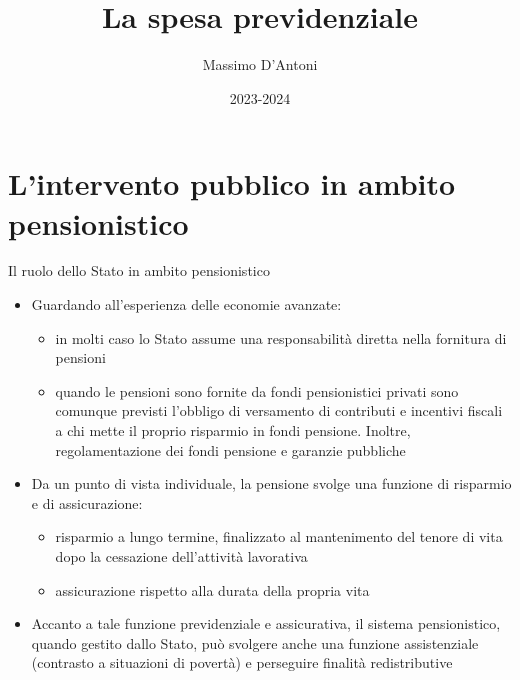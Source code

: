 \documentclass[11pt]{beamer}
\institute{Università di Siena}
\author{Massimo D'Antoni}
\date{2023-2024}
\title{La spesa previdenziale}
\begin{document}
\maketitle

\section{L'intervento pubblico in ambito pensionistico}

\begin{frame}{Il ruolo dello Stato in ambito pensionistico}
\begin{itemize}
\item Guardando all'esperienza delle economie avanzate:
\begin{itemize}
\item in molti caso lo Stato assume una responsabilità diretta nella fornitura di
pensioni
\item quando le pensioni sono fornite da fondi pensionistici privati sono
comunque previsti l'obbligo di versamento di contributi e incentivi
fiscali a chi mette il proprio risparmio in fondi pensione. Inoltre,
regolamentazione dei fondi pensione e garanzie pubbliche
\end{itemize}

\item Da un punto di vista individuale, la pensione svolge una funzione di
\alert{risparmio} e di \alert{assicurazione}:
\begin{itemize}
\item risparmio a lungo termine, finalizzato al mantenimento del tenore di vita
dopo la cessazione dell'attività lavorativa
\item assicurazione rispetto alla durata della propria vita
\end{itemize}

\item Accanto a tale funzione \alert{previdenziale} e \alert{assicurativa}, il sistema
pensionistico, quando gestito dallo Stato, può svolgere anche una funzione
\alert{assistenziale} (contrasto a situazioni di povertà) e perseguire finalità
\alert{redistributive}
\end{itemize}
\end{frame}
\end{document}
